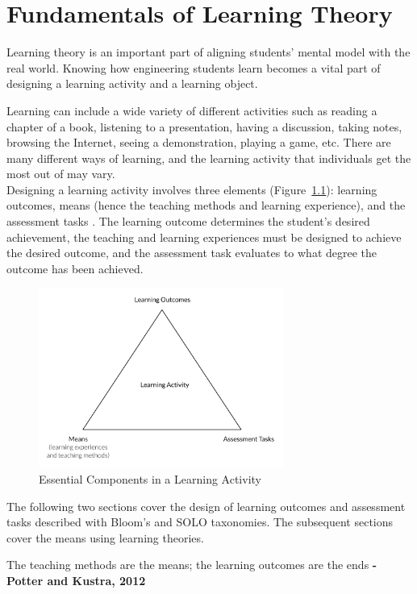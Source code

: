 \chapter{Fundamentals of Learning Theory}\label{chap_fundamentals_learning}


\begin{theorem}
	Learning theory is an important part of aligning students' mental model with the real world. Knowing how engineering students learn becomes a vital part of designing a learning activity and a learning object.
\end{theorem}

\noindent
Learning can include a wide variety of different activities such as reading a chapter of a book, listening to a presentation, having a discussion, taking notes, browsing the Internet, seeing a demonstration, playing a game, etc. There are many different ways of learning, and the learning activity that individuals get the most out of may vary. \\

\noindent
Designing a learning activity involves three elements (Figure~\ref{fig:course_triangle}): learning outcomes, means (hence the teaching methods and learning experience), and the assessment tasks \cite[p. 7]{potter2012primer}. The learning outcome determines the student's desired achievement, the teaching and learning experiences must be designed to achieve the desired outcome, and the assessment task evaluates to what degree the outcome has been achieved.

\begin{figure}[H]
\centering
\includegraphics[width=8cm]{figures/course_triangle}
\caption{Essential Components in a Learning Activity \cite[p. 7]{potter2012primer}}
\label{fig:course_triangle}
\end{figure}

\noindent 
The following two sections cover the design of learning outcomes and assessment tasks described with Bloom's and SOLO taxonomies. The subsequent sections cover the means using learning theories.
\begin{citat} []
The teaching methods are the means; the learning outcomes are the ends \textbf{- Potter and Kustra, 2012} \cite[p. 7]{potter2012primer}
\end{citat}

